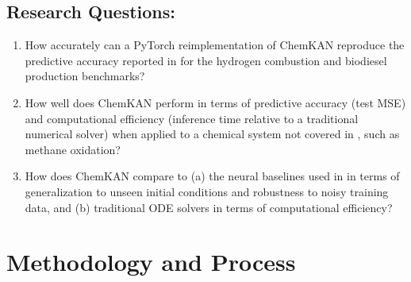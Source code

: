 \documentclass[11pt,a4paper]{article}
\begin{document}
\smallskip
\subsection*{Research Questions:}
\begin{enumerate}[label=\textbf{RQ\arabic*:}]
  \item How accurately can a PyTorch reimplementation of ChemKAN \cite{Koenig_2025} reproduce the predictive accuracy reported in \cite{Koenig_2025} for the hydrogen combustion and biodiesel production benchmarks?
  
  \item How well does ChemKAN perform in terms of predictive accuracy (test MSE) and computational efficiency (inference time relative to a traditional numerical solver) when applied to a chemical system not covered in \cite{Koenig_2025}, such as methane oxidation?
  
  \item How does ChemKAN compare to (a) the neural baselines used in \cite{Koenig_2025} in terms of generalization to unseen initial conditions and robustness to noisy training data, and (b) traditional ODE solvers in terms of computational efficiency?
\end{enumerate}

\section*{Methodology and Process}
\end{document}
